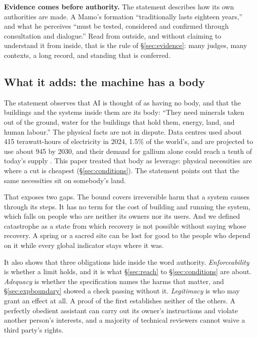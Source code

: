 \documentclass[10pt,twocolumn,letterpaper]{article}
\theoremstyle{definition}
\newcommand{\para}[1]{\smallskip\noindent\textbf{#1}\enspace}
\begin{document}
\para{Evidence comes before authority.} The statement describes how its own authorities are made. A Mamo's formation ``traditionally lasts eighteen years,'' and what he perceives ``must be tested, considered and confirmed through consultation and dialogue.'' Read from outside, and without claiming to understand it from inside, that is the rule of \S\ref{sec:evidence}: many judges, many contexts, a long record, and standing that is conferred.

\subsection{What it adds: the machine has a body}

The statement observes that AI is thought of as having no body, and that the buildings and the systems inside them are its body: ``They need minerals taken out of the ground, water for the buildings that hold them, energy, land, and human labour.'' The physical facts are not in dispute. Data centres used about 415 terawatt-hours of electricity in 2024, 1.5\% of the world's, and are projected to use about 945 by 2030, and their demand for gallium alone could reach a tenth of today's supply \cite{iea}. This paper treated that body as leverage: physical necessities are where a cut is cheapest (\S\ref{sec:conditions}). The statement points out that the same necessities sit on somebody's land.

That exposes two gaps. The bound covers irreversible harm that a system causes through its steps. It has no term for the cost of building and running the system, which falls on people who are neither its owners nor its users. And we defined catastrophe as a state from which recovery is not possible without saying whose recovery. A spring or a sacred site can be lost for good to the people who depend on it while every global indicator stays where it was.

It also shows that three obligations hide inside the word authority. \emph{Enforceability} is whether a limit holds, and it is what \S\ref{sec:reach} to \S\ref{sec:conditions} are about. \emph{Adequacy} is whether the specification names the harms that matter, and \S\ref{sec:expboundary} showed a check passing without it. \emph{Legitimacy} is who may grant an effect at all. A proof of the first establishes neither of the others. A perfectly obedient assistant can carry out its owner's instructions and violate another person's interests, and a majority of technical reviewers cannot waive a third party's rights.
\end{document}
